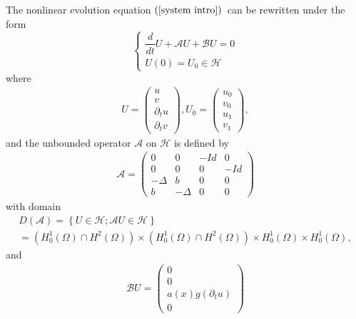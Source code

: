 \documentclass[11pt,reqno]{amsart}
\theoremstyle{plain}
\numberwithin{equation}{section}
\numberwithin{equation}{section}
\begin{document}
The nonlinear evolution equation $\left( \ref{system intro}\right) $\ can be
rewritten under the form 
\begin{equation}
\left\{ 
\begin{array}{c}
\dfrac{d}{dt}U+\mathcal{A}U+\mathcal{B}U=0 \\ 
U\left( 0\right) =U_{0}\in \mathcal{H}%
\end{array}%
\right.  \label{abstract system}
\end{equation}%
where 
\begin{equation*}
\begin{array}{c}
U=\left( 
\begin{array}{c}
u \\ 
v \\ 
\partial _{t}u \\ 
\partial _{t}v%
\end{array}%
\right) ,U_{0}=\left( 
\begin{array}{c}
u_{0} \\ 
v_{0} \\ 
u_{1} \\ 
v_{1}%
\end{array}%
\right) ,%
\end{array}%
\end{equation*}%
and the unbounded operator $\mathcal{A}$ on $\mathcal{H}$ is defined by%
\begin{equation*}
\begin{array}{c}
\mathcal{A=}\left( 
\begin{array}{cccc}
0 & 0 & -Id & 0 \\ 
0 & 0 & 0 & -Id \\ 
-\Delta & b & 0 & 0 \\ 
b & -\Delta & 0 & 0%
\end{array}%
\right)%
\end{array}%
\end{equation*}%
with domain 
\begin{equation*}
\begin{array}{l}
D\left( \mathcal{A}\right) =\left\{ U\in \mathcal{H};\mathcal{A}U\in 
\mathcal{H}\right\} \\ 
=\left( H_{0}^{1}\left( \Omega \right) \cap H^{2}\left( \Omega \right)
\right) \times \left( H_{0}^{1}\left( \Omega \right) \cap H^{2}\left( \Omega
\right) \right) \times H_{0}^{1}\left( \Omega \right) \times H_{0}^{1}\left(
\Omega \right) ,%
\end{array}%
\end{equation*}%
and%
\begin{equation*}
\begin{array}{c}
\mathcal{B}U=\left( 
\begin{array}{c}
0 \\ 
0 \\ 
a\left( x\right) g\left( \partial _{t}u\right) \\ 
0%
\end{array}%
\right)%
\end{array}%
\end{equation*}%
\end{document}

